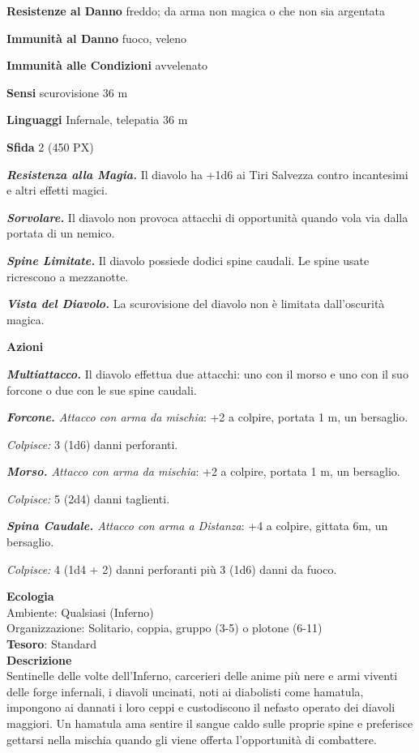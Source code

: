 \begin{multicols}{2}
	\textbf{Resistenze al Danno} freddo; da arma non magica o che non sia argentata

	\textbf{Immunità al Danno} fuoco, veleno

	\textbf{Immunità alle Condizioni} avvelenato

	\textbf{Sensi} scurovisione 36 m

	\textbf{Linguaggi} Infernale, telepatia 36 m

	\textbf{Sfida} 2 (450 PX)

	\textit{\textbf{Resistenza alla Magia.}} Il diavolo ha +1d6 ai Tiri Salvezza contro incantesimi e altri effetti magici.

	\textit{\textbf{Sorvolare.}} Il diavolo non provoca attacchi di opportunità quando vola via dalla portata di un nemico.

	\textit{\textbf{Spine Limitate.}} Il diavolo possiede dodici spine caudali. Le spine usate ricrescono a mezzanotte.

	\textit{\textbf{Vista del Diavolo.}} La scurovisione del diavolo non è limitata dall'oscurità magica.

	\textbf{Azioni}

	\textit{\textbf{Multiattacco.}} Il diavolo effettua due attacchi: uno con il morso e uno con il suo forcone o due con le sue spine caudali.

	\textit{\textbf{Forcone.} Attacco con arma da mischia}: +2 a colpire, portata 1 m, un bersaglio.

	\textit{Colpisce:} 3 (1d6) danni perforanti.

	\textit{\textbf{Morso.} Attacco con arma da mischia}: +2 a colpire, portata 1 m, un bersaglio.

	\textit{Colpisce:} 5 (2d4) danni taglienti.

	\textit{\textbf{Spina Caudale.} Attacco con arma a Distanza}: +4 a colpire, gittata 6m, un bersaglio.

	\textit{Colpisce:} 4 (1d4 + 2) danni perforanti più 3 (1d6) danni da fuoco.

	\textbf{Ecologia}\\
	Ambiente: Qualsiasi (Inferno)\\
	Organizzazione: Solitario, coppia, gruppo (3-5) o plotone (6-11)\\
	\textbf{Tesoro}: Standard\\
	\textbf{Descrizione}\\
	Sentinelle delle volte dell'Inferno, carcerieri delle anime più nere e armi viventi delle forge infernali, i diavoli uncinati, noti ai diabolisti come hamatula, impongono ai dannati i loro ceppi e custodiscono il nefasto operato dei diavoli maggiori. Un hamatula ama sentire il sangue caldo sulle proprie spine e preferisce gettarsi nella mischia quando gli viene offerta l'opportunità di combattere.


\end{multicols}
